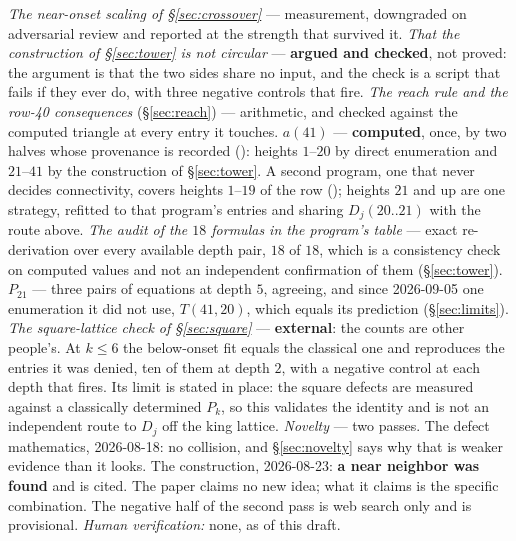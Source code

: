 \documentclass[11pt]{article}
\begin{document}
{\emph{The near-onset scaling of \S\ref{sec:crossover}} --- measurement,
downgraded on adversarial review and reported at the strength that survived it.
\emph{That the construction of \S\ref{sec:tower} is not circular} ---
\textbf{argued and checked}, not proved: the argument is that the two sides
share no input, and the check is a script that fails if they ever do, with
three negative controls that fire.
\emph{The reach rule and the row-40 consequences} (\S\ref{sec:reach}) ---
arithmetic, and checked against the computed triangle at every entry it
touches.
\emph{$a(41)$} --- \textbf{computed}, once, by two halves whose provenance is
recorded (): heights $1$--$20$ by direct
enumeration and $21$--$41$ by the construction of \S\ref{sec:tower}. A second
program, one that never decides connectivity, covers heights $1$--$19$ of the
row (); heights $21$ and up are one
strategy, refitted to that program's entries and sharing $D_j(20..21)$ with
the route above.
\emph{The audit of the $18$ formulas in the program's table} --- exact
re-derivation over every available depth pair, $18$ of $18$, which is a
consistency check on computed values and not an independent confirmation of
them (\S\ref{sec:tower}).
\emph{$P_{21}$} --- three pairs of equations at depth $5$, agreeing, and since
2026-09-05 one enumeration it did not use, $T(41,20)$, which equals its
prediction (\S\ref{sec:limits}).
\emph{The square-lattice check of \S\ref{sec:square}} --- \textbf{external}:
the counts are other people's. At $k \le 6$ the below-onset fit equals the
classical one and reproduces the entries it was denied, ten of them at depth
$2$, with a negative control at each depth that fires. Its limit is stated in
place: the square defects are measured against a classically determined
$P_k$, so this validates the identity and is not an independent route to
$D_j$ off the king lattice.
\emph{Novelty} --- two passes. The defect mathematics, 2026-08-18: no
collision, and \S\ref{sec:novelty} says why that is weaker evidence than it
looks. The construction, 2026-08-23: \textbf{a near neighbor was found} and is
cited. The paper claims no new idea; what it claims is the specific
combination. The negative half of the second pass is web search only and is
provisional.
\emph{Human verification:} none, as of this draft.}
\end{document}
